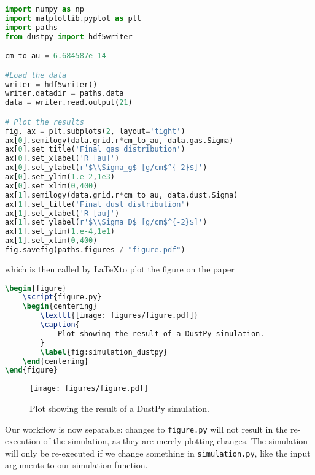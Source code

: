 \documentclass{aa}
\begin{document}
\begin{lstlisting}[language=python, caption=figure.py]
import numpy as np
import matplotlib.pyplot as plt
import paths
from dustpy import hdf5writer

cm_to_au = 6.684587e-14

#Load the data
writer = hdf5writer()
writer.datadir = paths.data
data = writer.read.output(21)

# Plot the results
fig, ax = plt.subplots(2, layout='tight')
ax[0].semilogy(data.grid.r*cm_to_au, data.gas.Sigma)
ax[0].set_title('Final gas distribution')
ax[0].set_xlabel('R [au]')
ax[0].set_ylabel(r'$\\Sigma_g$ [g/cm$^{-2}$]')
ax[0].set_ylim(1.e-2,1e3)
ax[0].set_xlim(0,400)
ax[1].semilogy(data.grid.r*cm_to_au, data.dust.Sigma)
ax[1].set_title('Final dust distribution')
ax[1].set_xlabel('R [au]')
ax[1].set_ylabel(r'$\\Sigma_D$ [g/cm$^{-2}$]')
ax[1].set_ylim(1.e-4,1e1)
ax[1].set_xlim(0,400)
fig.savefig(paths.figures / "figure.pdf")
\end{lstlisting}

which is then called by \LaTeX to plot the figure on the paper

\begin{lstlisting}[language=TeX]
\begin{figure}
    \script{figure.py}
    \begin{centering}
        \texttt{[image: figures/figure.pdf]}
        \caption{
            Plot showing the result of a DustPy simulation.
        }
        \label{fig:simulation_dustpy}
    \end{centering}
\end{figure}
\end{lstlisting}

\begin{figure}
    \begin{centering}
        \texttt{[image: figures/figure.pdf]}
        \caption{
            Plot showing the result of a DustPy simulation.
        }
        \label{fig:simulation_dustpy}
    \end{centering}
\end{figure}

Our workflow is now separable: changes to \texttt{figure.py} will not result in the re-execution of the simulation, as they are merely plotting changes.
The simulation will only be re-executed if we change something in \texttt{simulation.py}, like the input arguments to our simulation function.
\end{document}
